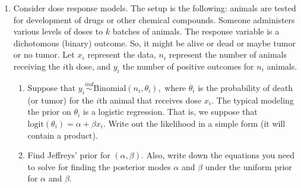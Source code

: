 \documentclass[11pt]{article}
\begin{document}
\begin{enumerate}
\item Consider  dose response models. The setup is the following: animals are tested for development of drugs or other chemical compounds. Someone administers various levels of doses to $k$ batches of animals. The response variable is a dichotomous (binary) outcome. So, it might be alive or dead or maybe tumor or no tumor. Let $x_i$ represent the data, $n_i$ represent the number of animals receiving the $i$th dose, and $y_i$ the number of positive outcomes for $n_i$ animals. 
\begin{enumerate}
\item Suppose that $y_i \stackrel{ind}{\sim} \text{Binomial}(n_i, \theta_i),$ where
$\theta_i$ is the probability of death (or tumor) for the $i$th animal that receives dose $x_i$. The typical modeling the prior on $\theta_i$ is a logistic regression. That is, we suppose that 
$\text{logit}(\theta_i) = \alpha + \beta x_i.$
Write out the likelihood in a simple form (it will contain a product). 
\item Find Jeffreys' prior for  $(\alpha, \beta).$ Also, write down the equations you need to solve for finding the posterior modes $\alpha$ and $\beta$ under the uniform prior for $\alpha$ and $\beta.$
\end{enumerate}

%
%







\end{enumerate}
\end{document}
